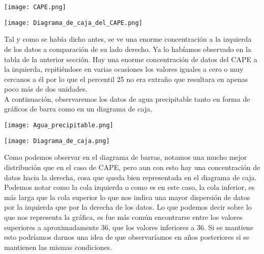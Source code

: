 \documentclass[a4paper,12pt]{article}
\begin{document}
\begin{center}
\texttt{[image: CAPE.png]}
\end{center}

\begin{center}
\texttt{[image: Diagrama\_de\_caja\_del\_CAPE.png]}
\end{center}

\noindent
Tal y como se había dicho antes, se ve una enorme concentración a la izquierda de los datos a comparación de su lado derecho. Ya lo habíamos observado en la tabla de la anterior sección. Hay una enorme concentración de datos del CAPE a la izquierda, repitiéndose en varias ocasiones los valores iguales a cero o muy cercanos a él por lo que el percentil 25 no era extraño que resultara en apenas poco más de dos unidades. \\

\noindent
A continuación, observaremos los datos de agua precipitable tanto en forma de gráficos de barra como en un diagrama de caja.

\begin{center}
\texttt{[image: Agua\_precipitable.png]}
\end{center}

\begin{center}
\texttt{[image: Diagrama\_de\_caja.png]}
\end{center}

\noindent
Como podemos observar en el diagrama de barras, notamos una mucho mejor distribución que en el caso de CAPE, pero aun con esto hay una concentración de datos hacia la derecha, cosa que queda bien representada en el diagrama de caja. Podemos notar como la cola izquierda o como es en este caso, la cola inferior, es más larga que la cola superior lo que nos indica una mayor dispersión de datos por la izquierda que por la derecha de los datos. Lo que podemos decir sobre lo que nos representa la gráfica, es fue más común encontrarse entre los valores superiores a aproximadamente 36, que los valores inferiores a 36. Si se mantiene esto podríamos darnos una idea de que observaríamos en años posteriores si se mantienen las mismas condiciones.
\end{document}
